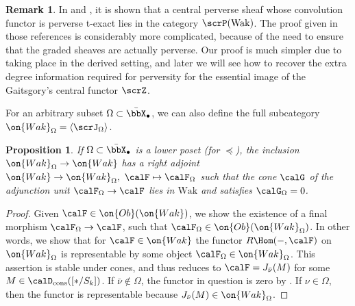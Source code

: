 \documentclass[10pt, reqno]{amsart}
\theoremstyle{plain}
\newtheorem{proposition}[theorem]{Proposition}
\theoremstyle{definition}
\newtheorem{remark}[theorem]{Remark}
\numberwithin{equation}{section}
\begin{document}
	\begin{remark}
		In \cite[Proposition 5]{AB09} and \cite[Proposition 4.4.1]{AR}, it is shown that a central perverse sheaf whose convolution functor is perverse t-exact lies in the category $\scrP(\mathrm{Wak})$. The  proof given in those references is considerably more complicated, because of the need to ensure that the graded sheaves are actually perverse. Our proof is much simpler due to taking place in the derived setting, and later we will see how to recover the extra degree information required for perversity for the essential image of the Gaitsgory's central functor $\scrZ$.
	\end{remark}
	
	For an arbitrary subset $\Omega \subset \bar\bbX_\bullet$, we can also define the full subcategory $\on{Wak}_{\Omega}=\langle\scrJ_\Omega\rangle$.
	
	\begin{proposition}\label{prop_wak_filtr}
		If $\Omega \subset \bar\bbX_\bullet$ is a lower poset (for $\preceq$), the inclusion $\on{Wak}_{\Omega} \to \on{Wak}$ has a right adjoint $\on{Wak} \to \on{Wak}_{ \Omega},\ \calF \mapsto \calF_{\Omega}$ such that the cone $\calG$ of the adjunction unit $\calF_{\Omega} \to \calF$ lies in $\mathrm{Wak}$ and satisfies $\calG_{\Omega}=0$. 
	\end{proposition}
	
	\begin{proof}
		Given $\calF \in \on{Ob}(\on{Wak})$, we show the existence of a final morphism $\calF_{\Omega} \to \calF$, such that $\calF_{ \Omega} \in \on{Ob}(\on{  Wak}_{\Omega})$. In other words, we show that for $\calF\in \on{Wak}$ the functor $R\Hom(-,\calF)$ on $\on{Wak}_{\Omega}$ is representable by some object $\calF_{\Omega}\in \on{Wak}_\Omega$. This assertion is stable under cones, and thus reduces to $\calF=J_{\bar \nu}(M)$ for some $M\in \calD_{\mathrm{cons}}([\ast/S_k])$. If $\bar \nu\notin \Omega$, the functor in question is zero by . If $\nu\in \Omega$, then the functor is representable because $J_{\bar\nu}(M)\in \on{Wak}_{\Omega}$.
	\end{proof}
	
\end{document}
